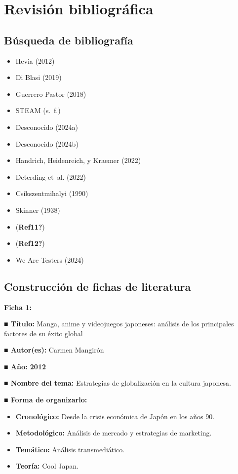 \documentclass[
  letterpaper,
  DIV=11,
  numbers=noendperiod]{scrreprt}
\providecommand{\tightlist}{%
  \setlength{\itemsep}{0pt}\setlength{\parskip}{0pt}}\usepackage{longtable,booktabs,array}
\begin{document}
\hypertarget{revisiuxf3n-bibliogruxe1fica}{%
\section{Revisión bibliográfica}\label{revisiuxf3n-bibliogruxe1fica}}

\hypertarget{buxfasqueda-de-bibliografuxeda}{%
\subsection{Búsqueda de
bibliografía}\label{buxfasqueda-de-bibliografuxeda}}

\begin{itemize}
\tightlist
\item
  Hevia (2012)
\item
  Di Blasi (2019)
\item
  Guerrero Pastor (2018)
\item
  STEAM (s.~f.)
\item
  Desconocido (2024a)
\item
  Desconocido (2024b)
\item
  Handrich, Heidenreich, y Kraemer (2022)
\item
  Deterding et~al. (2022)
\item
  Csikszentmihalyi (1990)
\item
  Skinner (1938)
\item
  (\textbf{Ref11?})
\item
  (\textbf{Ref12?})
\item
  We Are Testers (2024)
\end{itemize}

\hypertarget{construcciuxf3n-de-fichas-de-literatura}{%
\subsection{Construcción de fichas de
literatura}\label{construcciuxf3n-de-fichas-de-literatura}}

\textbf{Ficha 1:}

\textbf{■ Título:} Manga, anime y videojuegos japoneses: análisis de los
principales factores de su éxito global

\textbf{■ Autor(es):} Carmen Mangirón

\textbf{■ Año: 2012}

\textbf{■ Nombre del tema:} Estrategias de globalización en la cultura
japonesa.

\textbf{■ Forma de organizarlo:}

\begin{itemize}
\item
  \textbf{Cronológico:} Desde la crisis económica de Japón en los años
  90.
\item
  \textbf{Metodológico:} Análisis de mercado y estrategias de marketing.
\item
  \textbf{Temático:} Análisis transmediático.
\item
  \textbf{Teoría:} Cool Japan.
\end{itemize}
\end{document}
